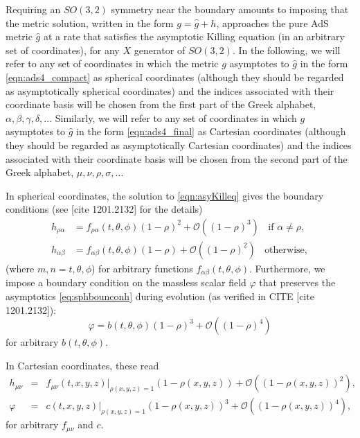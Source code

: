 \documentclass[a4paper,11pt]{article}
\begin{document}
Requiring an $SO(3,2)$ symmetry near the boundary amounts to imposing that the metric solution, written in the form $g=\hat{g}+h$, approaches the pure AdS metric $\hat{g}$ at a rate that satisfies the asymptotic Killing equation (in an arbitrary set of coordinates), 
for any $X$ generator of $SO(3,2)$. 
In the following, we will refer to any set of coordinates in which the metric $g$ asymptotes to $\hat{g}$ in the form \eqref{eqn:ads4_compact} as spherical coordinates (although they should be regarded as asymptotically spherical coordinates) and the indices associated with their coordinate basis will be chosen from the first part of the Greek alphabet, $\alpha,\beta,\gamma,\delta,\dots$
Similarly, we will refer to any set of coordinates in which $g$ asymptotes to $\hat{g}$ in the form \eqref{eqn:ads4_final} as Cartesian coordinates (although they should be regarded as asymptotically Cartesian coordinates) and the indices associated with their coordinate basis will be chosen from the second part of the Greek alphabet, $\mu,\nu,\rho,\sigma,\dots$

In spherical coordinates, the solution to \eqref{eqn:asyKilleq} gives the boundary conditions (see [cite 1201.2132] for the details)
\begin{eqnarray}
\label{eq:sphbounconh}
h_{\rho\alpha}&=f_{\rho\alpha}(t,\theta,\phi)(1-\rho)^2+\mathcal{O}((1-\rho)^3) \;\; \textrm{ if $\alpha\neq\rho$}, \\ \nonumber
h_{\alpha\beta}&=f_{\alpha\beta}(t,\theta,\phi)(1-\rho)+\mathcal{O}((1-\rho)^{2}) \;\; \textrm{ otherwise},
\end{eqnarray}
(where $m,n=t,\theta,\phi$) for arbitrary functions $f_{\alpha\beta}(t,\theta,\phi)$. Furthermore, we impose a boundary condition on the massless scalar field $\varphi$ that preserves the asymptotics \eqref{eq:sphbounconh} during evolution (as verified in CITE [cite 1201.2132]):
\begin{equation}\label{eq:sphbounconphi}
\varphi=b(t,\theta,\phi)(1-\rho)^3+\mathcal{O}((1-\rho)^4)
\end{equation}
for arbitrary $b(t,\theta,\phi)$.

In Cartesian coordinates, these read
\begin{eqnarray}
\label{eq:carbouncondh}
h_{\mu\nu}&=&f_{\mu\nu}(t,x,y,z)|_{\rho(x,y,z)=1}(1-\rho(x,y,z))+\mathcal{O}((1-\rho(x,y,z))^{2}), \\
\label{eq:carbouncondphi}
\varphi&=&c(t,x,y,z)|_{\rho(x,y,z)=1}(1-\rho(x,y,z))^3+\mathcal{O}((1-\rho(x,y,z))^{4}), 
\end{eqnarray}
for arbitrary $f_{\mu\nu}$ and $c$.
\end{document}
